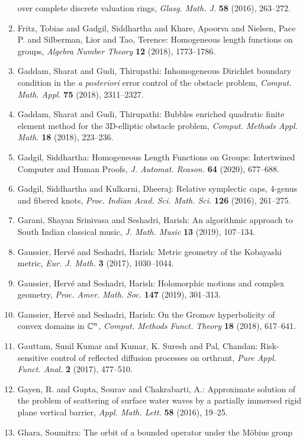 \begin{enumerate}
over complete discrete valuation rings, \emph{Glasg. Math. J.} {\bf 58} (2016), 263--272.
\item Fritz, Tobias and Gadgil, Siddhartha and Khare, Apoorva and Nielsen, Pace P. and Silberman, Lior and Tao, Terence: Homogeneous length functions on groups, \emph{Algebra Number Theory} {\bf 12} (2018), 1773--1786.
\item Gaddam, Sharat and Gudi, Thirupathi: Inhomogeneous {D}irichlet boundary condition in the {\it a
posteriori} error control of the obstacle problem, \emph{Comput. Math. Appl.} {\bf 75} (2018), 2311--2327.
\item Gaddam, Sharat and Gudi, Thirupathi: Bubbles enriched quadratic finite element method for the
3{D}-elliptic obstacle problem, \emph{Comput. Methods Appl. Math.} {\bf 18} (2018), 223--236.
\item Gadgil, Siddhartha: Homogeneous {L}ength {F}unctions on {G}roups: {I}ntertwined
{C}omputer and {H}uman {P}roofs, \emph{J. Automat. Reason.} {\bf 64} (2020), 677--688.
\item Gadgil, Siddhartha and Kulkarni, Dheeraj: Relative symplectic caps, 4-genus and fibered knots, \emph{Proc. Indian Acad. Sci. Math. Sci.} {\bf 126} (2016), 261--275.
\item Garani, Shayan Srinivasa and Seshadri, Harish: An algorithmic approach to {S}outh {I}ndian classical music, \emph{J. Math. Music} {\bf 13} (2019), 107--134.
\item Gaussier, Herv\'{e} and Seshadri, Harish: Metric geometry of the {K}obayashi metric, \emph{Eur. J. Math.} {\bf 3} (2017), 1030--1044.
\item Gaussier, Herv\'{e} and Seshadri, Harish: Holomorphic motions and complex geometry, \emph{Proc. Amer. Math. Soc.} {\bf 147} (2019), 301--313.
\item Gaussier, Herv\'{e} and Seshadri, Harish: On the {G}romov hyperbolicity of convex domains in {$\Bbb
C^n$}, \emph{Comput. Methods Funct. Theory} {\bf 18} (2018), 617--641.
\item Gauttam, Sunil Kumar and Kumar, K. Suresh and Pal, Chandan: Risk-sensitive control of reflected diffusion processes on
orthrant, \emph{Pure Appl. Funct. Anal.} {\bf 2} (2017), 477--510.
\item Gayen, R. and Gupta, Sourav and Chakrabarti, A.: Approximate solution of the problem of scattering of surface
water waves by a partially immersed rigid plane vertical
barrier, \emph{Appl. Math. Lett.} {\bf 58} (2016), 19--25.
\item Ghara, Soumitra: The orbit of a bounded operator under the {M}\"{o}bius group

\end{enumerate}
